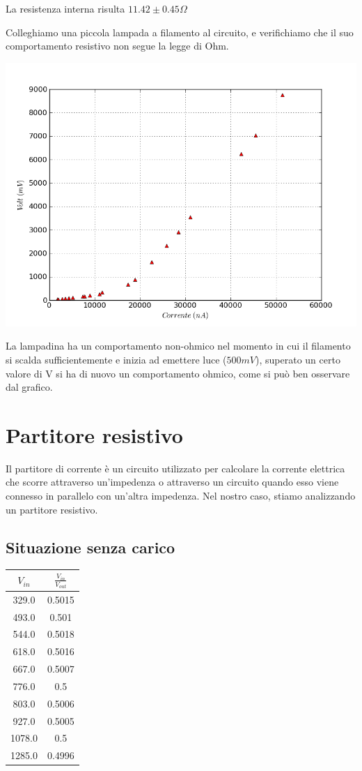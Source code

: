 La resistenza interna risulta $11.42 \pm 0.45 \Omega$

Colleghiamo una piccola lampada a filamento al circuito, e verifichiamo che il suo comportamento resistivo non segue la legge di Ohm. 

\includegraphics[scale=0.75]{grafici/C1/lampa.png}

La lampadina ha un comportamento non-ohmico nel momento in cui il filamento si scalda sufficientemente e inizia ad emettere luce ($500mV$), superato un certo valore di V si ha di nuovo un comportamento ohmico, come si può ben osservare dal grafico.


\section{Partitore resistivo}
Il partitore di corrente è un circuito utilizzato per calcolare la corrente elettrica che scorre attraverso un'impedenza o attraverso un circuito quando esso viene connesso in parallelo con un'altra impedenza.
Nel nostro caso, stiamo analizzando un partitore resistivo. 

\subsection{Situazione senza carico}
\begin{center}
\begin{tabular}{*{2}{c}}
$V_{in}$ & $\frac{V_{in}}{V_{out}}$\\
\midrule
329.0 & 0.5015 \\
493.0 & 0.501 \\
544.0 & 0.5018 \\
618.0 & 0.5016 \\
667.0 & 0.5007 \\
776.0 & 0.5 \\
803.0 & 0.5006 \\
927.0 & 0.5005 \\
1078.0 & 0.5 \\
1285.0 & 0.4996 \\
\end{tabular}

\end{center}


